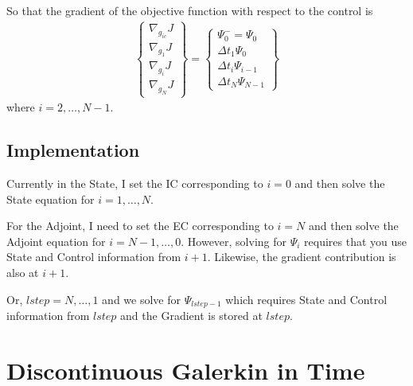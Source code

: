 \documentclass[10pt]{article}
\begin{document}
So that the gradient of the objective function with respect to the control is
\begin{eqnarray} \label{e:backward_euler_grad_2}
\left\{\begin{array}{c} 
\nabla_{g_{ic}} J \\ \nabla_{g_1} J \\ \nabla_{g_i} J \\ \nabla_{g_N} J 
\end{array}\right\}
= \left\{\begin{array}{c}
\Psi_0^- = \Psi_0 \\ 
\Delta t_1 \Psi_0 \\ 
\Delta t_{i} \Psi_{i-1} \\ 
\Delta t_N \Psi_{N-1} 
\end{array}\right\}
\end{eqnarray}
where $i=2,\dots,N-1$.

\subsection*{Implementation}

Currently in the State, I set the IC corresponding to $i=0$ and then solve the
State equation for $i=1,\dots,N$.

For the Adjoint, I need to set the EC corresponding to $i=N$ and then solve
the Adjoint equation for $i=N-1,\dots,0$.  However, solving for $\Psi_i$
requires that you use State and Control information from $i+1$.  Likewise, the
gradient contribution is also at $i+1$.

Or, $lstep=N,\dots,1$ and we solve for $\Psi_{lstep-1}$ which requires State
and Control information from $lstep$ and the Gradient is stored at $lstep$.

%
\section*{Discontinuous Galerkin in Time}
\end{document}
